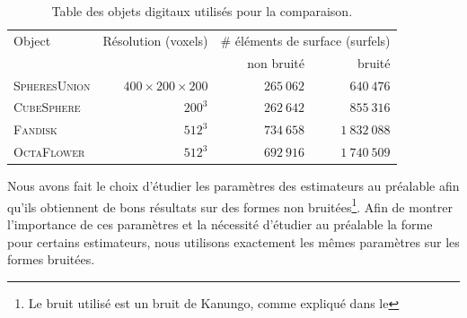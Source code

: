 %
\begin{table}[h]
  \begin{center}
    \caption{Table des objets digitaux utilisés pour la comparaison.}
    \label{tab:feature-objects}
    \begin{tabular}{@{}lrrr@{}}
      \toprule
      Object & Résolution (voxels) & \multicolumn{2}{r}{\# éléments de surface (surfels)} \\ \cmidrule(l){3-4}
                     &            & non bruité & bruité \\ \midrule
      \textsc{SpheresUnion}    & $400 \times 200 \times 200$ & $265~062$ & $640~476$ \\
      \textsc{CubeSphere}     & $200^3$    & $262~642$ & $855~316$   \\
      \textsc{Fandisk}        & $512^3$    & $734~658$ & $1~832~088$   \\
      \textsc{OctaFlower}     & $512^3$    & $692~916$ & $1~740~509$   \\ \bottomrule
    \end{tabular}
  \end{center}
\end{table}


Nous avons fait le choix d'étudier les paramètres des estimateurs au préalable
afin qu'ils obtiennent de bons résultats sur des formes non bruitées\footnote{Le
bruit utilisé est un bruit de Kanungo, comme expliqué dans le
}. Afin de montrer l'importance de ces paramètres et
la nécessité d'étudier au préalable la forme pour certains estimateurs, nous
utilisons exactement les mêmes paramètres sur les formes bruitées.


